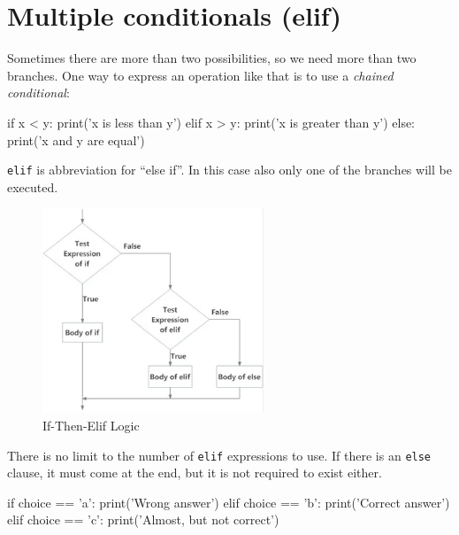 
\hypertarget{condicionales-multiples-elif}{%
\section{Multiple conditionals
(elif)}\label{condicionales-multiples-elif}}

 

Sometimes there are more than two possibilities, so we need more than two branches. One way to express an operation like that is to use a \emph{chained conditional}:

\begin{python}[frame=single]
if x < y:
    print('x is less than y')
elif x > y:
    print('x is greater than y')
else:
    print('x and y are equal')
\end{python}

\texttt{elif} is abbreviation for ``else if''. In this case also only one of the branches will be executed.

\begin{figure}[t]
\centering
\includegraphics[width=250px]{images/elif-eng.png}
\caption{If-Then-Elif Logic}
\label{fig_elif}
\end{figure}

There is no limit to the number of \texttt{elif} expressions to use. If there is an \texttt{else} clause, it must come at the end, but it is not required to exist either.

 

\begin{python}[frame=single]
if choice == 'a':
    print('Wrong answer')
elif choice == 'b':
    print('Correct answer')
elif choice == 'c':
    print('Almost, but not correct')
\end{python}

